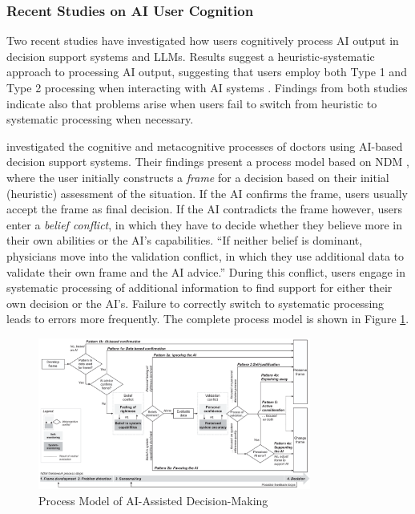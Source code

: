 \subsubsection{Recent Studies on AI User Cognition} \label{sssec:studies_ai_cognition}

Two recent studies have investigated how users cognitively process AI output in decision support systems and \acp{LLM}. Results suggest a heuristic-systematic approach to processing AI output, suggesting that users employ both Type 1 and Type 2 processing when interacting with AI systems \parencite{Jussupow2021,Kazemitabaar2024}. Findings from both studies indicate also that problems arise when users fail to switch from heuristic to systematic processing when necessary.

\cite{Jussupow2021} investigated the cognitive and metacognitive processes of doctors using \ac{AI}-based decision support systems. Their findings present a process model based on \ac{NDM} \parencite{Klein2008, Klein2015}, where the user initially constructs a \textit{frame} for a decision based on their initial (heuristic) assessment of the situation. If the \ac{AI} confirms the frame, users usually accept the frame as final decision. If the \ac{AI} contradicts the frame however, users enter a \textit{belief conflict}, in which they have to decide whether they believe more in their own abilities or the \ac{AI}'s capabilities. “If neither belief is dominant, physicians move into the validation conflict, in which they use additional data to validate their own frame and the AI advice.” During this conflict, users engage in systematic processing of additional information to find support for either their own decision or the \ac{AI}'s. Failure to correctly switch to systematic processing leads to errors more frequently. The complete process model is shown in Figure \ref{fig:jussupow_process_model}.

\begin{figure}[ht]
    \centering
    \includegraphics[width=0.8\textwidth]{images/fig_jussupow_model.png}
    \caption[Process Model of AI-Assisted Decision-Making]{Process Model of AI-Assisted Decision-Making \parencite{Jussupow2021}}
    \label{fig:jussupow_process_model}
\end{figure}

